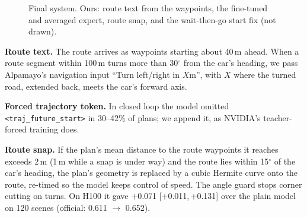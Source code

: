 \documentclass{article}
\begin{document}
\begin{figure}[h]
\centering
{}
\caption{Final system. Ours: route text from the waypoints, the fine-tuned and averaged expert, route snap, and the wait-then-go start fix (not drawn).}
\end{figure}

\textbf{Route text.} The route arrives as waypoints starting about 40\,m ahead. When a route segment within 100\,m
turns more than 30$^\circ$ from the car's heading, we pass Alpamayo's navigation input ``Turn left/right in
$X$m'', with $X$ where the turned road, extended back, meets the car's forward axis.

\textbf{Forced trajectory token.} In closed loop the model omitted \texttt{<traj\_future\_start>} in 30--42\% of
plans; we append it, as NVIDIA's teacher-forced training does.

\textbf{Route snap.} If the plan's mean distance to the route waypoints it reaches exceeds 2\,m (1\,m while a snap is
under way) and the route lies within 15$^\circ$ of the car's heading, the plan's geometry is replaced by a cubic Hermite
curve onto the route, re-timed so the model keeps control of speed. The angle guard stops corner cutting on turns.
On H100 it gave +0.071 [+0.011,\,+0.131] over the plain model on 120 scenes (official: 0.611 $\rightarrow$ 0.652).
\end{document}
